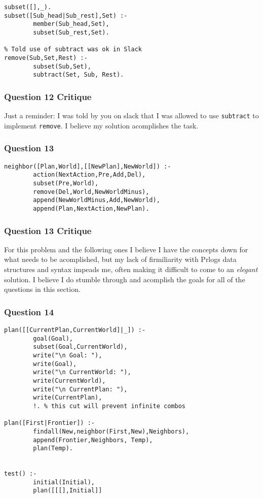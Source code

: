 \documentclass[11pt]{article}
\begin{document}
\begin{verbatim}
subset([],_). 
subset([Sub_head|Sub_rest],Set) :-
        member(Sub_head,Set),
        subset(Sub_rest,Set).
    
% Told use of subtract was ok in Slack
remove(Sub,Set,Rest) :-
        subset(Sub,Set),    
        subtract(Set, Sub, Rest).
\end{verbatim}

    \hypertarget{question-12-critique}{%
\subsubsection{Question 12 Critique}\label{question-12-critique}}

Just a reminder: I was told by you on slack that I was allowed to use
\texttt{subtract} to implement \texttt{remove}. I believe my solution
acomplishes the task.

    \hypertarget{question-13}{%
\subsubsection{Question 13}\label{question-13}}

\begin{verbatim}
neighbor([Plan,World],[[NewPlan],NewWorld]) :-
        action(NextAction,Pre,Add,Del),
        subset(Pre,World),
        remove(Del,World,NewWorldMinus),
        append(NewWorldMinus,Add,NewWorld),
        append(Plan,NextAction,NewPlan).
\end{verbatim}

    \hypertarget{question-13-critique}{%
\subsubsection{Question 13 Critique}\label{question-13-critique}}

For this problem and the following ones I believe I have the concepts
down for what needs to be acomplished, but my lack of firmiliarity with
Prlogs data structures and syntax impeads me, often making it difficult
to come to an \emph{elegant} solution. I believe I do stumble through
and acomplish the goals for all of the questions in this section.

    \hypertarget{question-14}{%
\subsubsection{Question 14}\label{question-14}}

\begin{verbatim}
plan([[CurrentPlan,CurrentWorld]|_]) :-
        goal(Goal),
        subset(Goal,CurrentWorld),
        write("\n Goal: "),
        write(Goal),
        write("\n CurrentWorld: "),
        write(CurrentWorld),
        write("\n CurrentPlan: "),
        write(CurrentPlan),
        !. % this cut will prevent infinite combos

plan([First|Frontier]) :-
        findall(New,neighbor(First,New),Neighbors),
        append(Frontier,Neighbors, Temp),
        plan(Temp).


test() :-
        initial(Initial),
        plan([[[],Initial]]
\end{verbatim}
\end{document}
